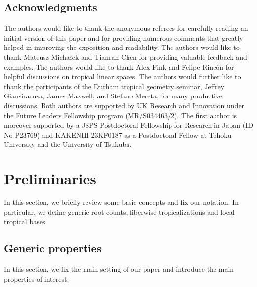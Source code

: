 \documentclass[12pt,reqno,a4paper]{amsart}
\theoremstyle{theoremstyle}
\theoremstyle{examplestyle}
\theoremstyle{algorithmstyle}
\begin{document}
\subsection*{Acknowledgments}
The authors would like to thank the anonymous referees for %
carefully reading an initial version of this paper and for providing numerous comments that greatly helped in improving the exposition and readability.  
%
%
The authors would like to thank Mateusz Michałek and Tianran Chen for providing valuable feedback and examples. The authors would like to thank Alex Fink and Felipe Rinc\'on for helpful discussions on tropical linear spaces. The authors would further like to thank the participants of the Durham tropical geometry seminar, Jeffrey Giansiracusa, James Maxwell, and Stefano Mereta, for many productive discussions. Both authors are supported by UK Research and Innovation under the Future Leaders Fellowship program (MR/S034463/2). The first author is moreover supported by a JSPS Postdoctoral Fellowship for Research in Japan (ID No P23769) and KAKENHI 23KF0187 as a Postdoctoral Fellow at Tohoku University and the University of Tsukuba.

\section{Preliminaries}\label{sec:preliminaries}
In this section, we briefly review some basic concepts and fix our notation.  In particular, we define generic root counts, fiberwise tropicalizations and local tropical bases.

\subsection{Generic properties}\label{sec:genericProperties}
In this section, we fix the main setting of our paper and introduce the main properties of interest.
\end{document}
